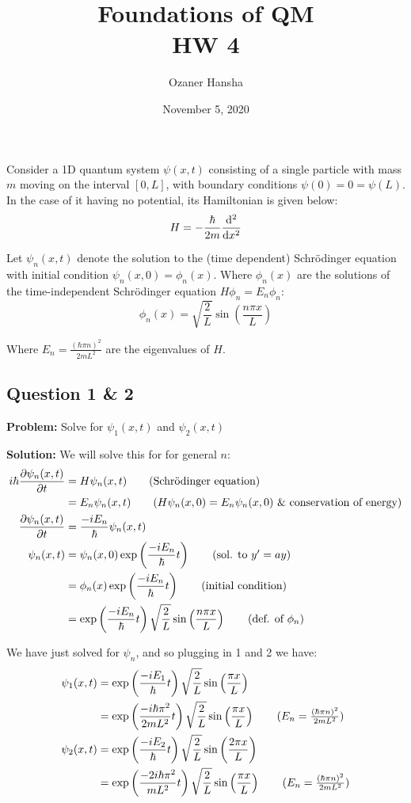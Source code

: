 \documentclass{article}
\begin{document}
\title{Foundations of QM\\ HW 4}
\author{Ozaner Hansha}
\date{November 5, 2020}
\maketitle

Consider a 1D quantum system $\psi(x,t)$ consisting of a single particle with mass $m$ moving on the interval $[0,L]$, with boundary conditions $\psi(0)=0=\psi(L)$. In the case of it having no potential, its Hamiltonian is given below:
$$H=-\frac{\hbar}{2m}\dv[2]{x}$$
\smallskip

Let $\psi_n(x,t)$ denote the solution to the (time dependent) Schrödinger equation with initial condition $\psi_n(x,0)=\phi_n(x)$. Where $\phi_n(x)$ are the solutions of the time-independent Schrödinger equation $H\phi_n=E_n\phi_n$:
$$\phi_n(x)=\sqrt{\frac{2}{L}}\sin\left(\frac{n\pi x}{L}\right)$$

Where $E_n=\frac{(\hbar\pi n)^2}{2mL^2}$ are the eigenvalues of $H$.
\smallskip



\subsection*{Question 1 \& 2}
\noindent\textbf{Problem:} Solve for $\psi_1(x,t)$ and $\psi_2(x,t)$
\bigskip

\noindent\textbf{Solution:} We will solve this for for general $n$:
\begin{align*}
    i\hbar\pdv{\psi_n(x,t)}{t}&=H\psi_n(x,t)\tag{Schrödinger equation}\\
    &=E_n\psi_n(x,t)\tag{$H\psi_n(x,0)=E_n\psi_n(x,0)$ \& conservation of energy}\\
    \pdv{\psi_n(x,t)}{t}&=\frac{-iE_n}{\hbar}\psi_n(x,t)\\
    \psi_n(x,t)&=\psi_n(x,0)\exp\left(\frac{-iE_n}{\hbar}t\right)\tag{sol. to $y'=ay$}\\
    &=\phi_n(x)\exp\left(\frac{-iE_n}{\hbar}t\right)\tag{initial condition}\\
    &=\exp\left(\frac{-iE_n}{\hbar}t\right)\sqrt{\frac{2}{L}}\sin\left(\frac{n\pi x}{L}\right)\tag{def. of $\phi_n$}
\end{align*}

We have just solved for $\psi_n$, and so plugging in 1 and 2 we have:
\begin{align*}
    \psi_1(x,t)&=\exp\left(\frac{-iE_1}{\hbar}t\right)\sqrt{\frac{2}{L}}\sin\left(\frac{\pi x}{L}\right)\\
    &=\exp\left(\frac{-i\hbar\pi^2}{2mL^2}t\right)\sqrt{\frac{2}{L}}\sin\left(\frac{\pi x}{L}\right)\tag{$E_n=\frac{(\hbar\pi n)^2}{2mL^2}$}\\
    \psi_2(x,t)&=\exp\left(\frac{-iE_2}{\hbar}t\right)\sqrt{\frac{2}{L}}\sin\left(\frac{2\pi x}{L}\right)\\
    &=\exp\left(\frac{-2i\hbar\pi^2}{mL^2}t\right)\sqrt{\frac{2}{L}}\sin\left(\frac{\pi x}{L}\right)\tag{$E_n=\frac{(\hbar\pi n)^2}{2mL^2}$}\\
\end{align*}
\bigskip
\end{document}
